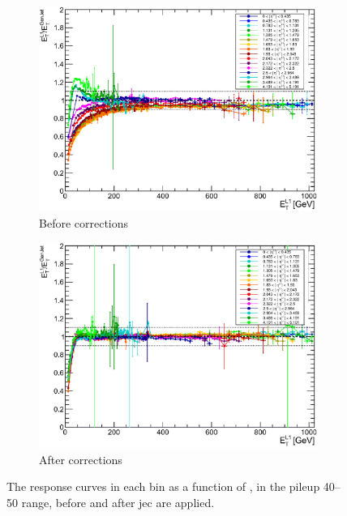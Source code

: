 \begin{figure}[ht]
    \centering
    \begin{subfigure}[b]{0.68\textwidth}
        \includegraphics[width=\textwidth]{./figures/jecs/response_before.pdf}
        \caption{Before corrections}
        \label{fig:detector_jecs_response_before}
    \end{subfigure}

    \begin{subfigure}[b]{0.68\textwidth}
        \includegraphics[width=\textwidth]{./figures/jecs/response_after.pdf}
        \caption{After corrections}
        \label{fig:detector_jecs_response_after}
    \end{subfigure}
\caption[The response curves in each \abseta bin as a function of \ptLOne, in the pileup 40--50 range, before and after jet energy corrections are applied]{The response curves in each \abseta bin as a function of \ptLOne, in the \gls{pileup} 40--50 range, before and after \acrlong{jec} are applied.}
\label{fig:detector_jecs_response}
\end{figure}

